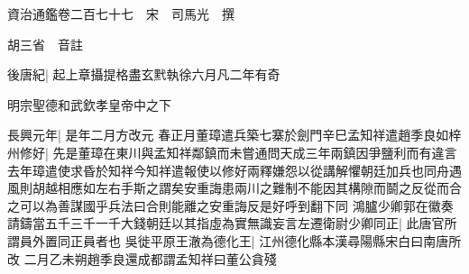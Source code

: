 






























































資治通鑑卷二百七十七　宋　司馬光　撰

胡三省　音註

後唐紀|{
	起上章攝提格盡玄黓執徐六月凡二年有奇}


明宗聖德和武欽孝皇帝中之下

長興元年|{
	是年二月方改元}
春正月董璋遣兵築七寨於劍門辛巳孟知祥遣趙季良如梓州修好|{
	先是董璋在東川與孟知祥鄰鎮而未嘗通問天成三年兩鎮因爭鹽利而有違言去年璋遣使求昏於知祥今知祥遣報使以修好兩釋嫌怨以從講解懼朝廷加兵也同舟遇風則胡越相應如左右手斯之謂矣安重誨患兩川之難制不能因其構隙而鬬之反從而合之可以為善謀國乎兵法曰合則能離之安重誨反是好呼到翻下同}
鴻臚少卿郭在徽奏請鑄當五千三千一千大錢朝廷以其指虛為實無識妄言左遷衛尉少卿同正|{
	此唐官所謂員外置同正員者也}
吳徙平原王澈為德化王|{
	江州德化縣本漢尋陽縣宋白曰南唐所改}
二月乙未朔趙季良還成都謂孟知祥曰董公貪殘

